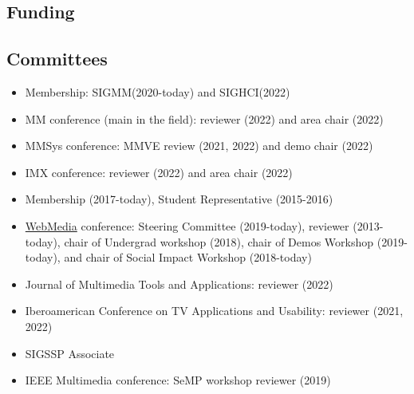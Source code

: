 \documentclass[10pt,a4paper,sans,colorlinks]{moderncv}
\begin{document}
\subsection{Funding}

\subsection{Committees}
  \begin{itemize}[mynosep]
    \item Membership: SIGMM(2020-today) and SIGHCI(2022)
    \item MM conference (main in the field): reviewer (2022) and area chair (2022)
    \item MMSys conference: MMVE review (2021, 2022) and demo chair (2022)
    \item IMX conference: reviewer (2022) and area chair (2022)
  \end{itemize}

  \begin{itemize}[mynosep]
  \item Membership (2017-today), Student Representative (2015-2016)
  \item\href{http://www.webmedia.org.br}{WebMedia} conference: Steering Committee (2019-today), reviewer (2013-today), \newline chair of Undergrad workshop (2018), chair of Demos Workshop (2019-today), and \newline chair of Social Impact Workshop (2018-today)
  \end{itemize}

\begin{itemize}[mynosep]
  \item Journal of Multimedia Tools and Applications: reviewer (2022)
  \item Iberoamerican Conference on TV Applications and Usability: reviewer (2021, 2022)
\end{itemize}

\begin{itemize}[mynosep]
  \item SIGSSP Associate
  \item IEEE Multimedia conference: SeMP workshop reviewer (2019)
\end{itemize}
\end{document}
